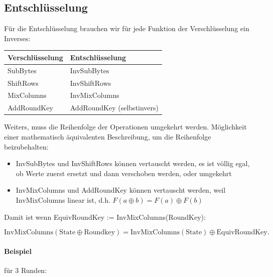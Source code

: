 \subsection{Entschlüsselung}

Für die Entschlüsselung brauchen wir für jede Funktion der Verschlüsselung ein Inverses:

\begin{center}
    \begin{tabular}{ ll } 
        \hline
        Verschlüsselung & Entschlüsselung \\ 
        \hline
        SubBytes & InvSubBytes \\
        ShiftRows & InvShiftRows \\
        MixColumns & InvMixColumns \\
        AddRoundKey & AddRoundKey (selbstinvers) \\
        \hline
    \end{tabular}
\end{center}

Weiters, muss die Reihenfolge der Operationen umgekehrt werden.
Möglichkeit einer mathematisch äquivalenten Beschreibung, um die Reihenfolge beizubehalten:

\begin{itemize}
    \item InvSubBytes und InvShiftRows können vertauscht werden, es ist völlig egal, ob Werte zuerst ersetzt und dann verschoben werden, oder umgekehrt
    \item InvMixColumns und AddRoundKey können vertauscht werden, weil InvMixColumns linear ist, d.h. $F(a\oplus b) = F(a) \oplus F(b)$
\end{itemize}

\noindent Damit ist wenn EquivRoundKey := InvMixColumns(RoundKey):

$$\text{InvMixColumns}(\text{State} \oplus \text{Roundkey}) = \text{InvMixColumns}(\text{State}) \oplus \text{EquivRoundKey}.$$ 

\paragraph{Beispiel} für 3 Runden:

